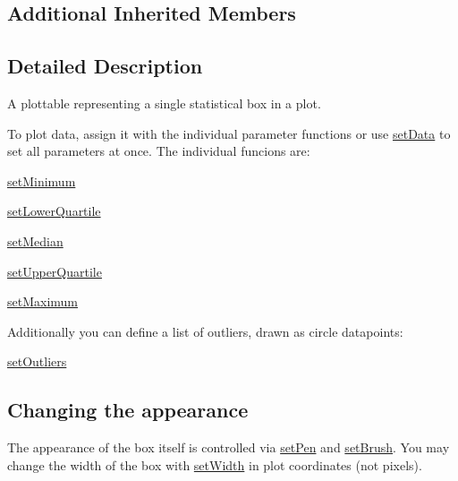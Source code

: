 \subsection*{Additional Inherited Members}


\subsection{Detailed Description}
A plottable representing a single statistical box in a plot. 



To plot data, assign it with the individual parameter functions or use \hyperlink{class_q_c_p_statistical_box_adf50c57b635edb12470c0e4a986aff37}{set\-Data} to set all parameters at once. The individual funcions are\-: \begin{DoxyItemize}
\item \hyperlink{class_q_c_p_statistical_box_a84ff7cc61ba44890f0c3e0c99c19941e}{set\-Minimum} \item \hyperlink{class_q_c_p_statistical_box_a680941af5e23d902013962fa67223f9e}{set\-Lower\-Quartile} \item \hyperlink{class_q_c_p_statistical_box_a65970e77a897da4ecb4b15300868aad3}{set\-Median} \item \hyperlink{class_q_c_p_statistical_box_a65a1375f941c5a2077b5201229e89346}{set\-Upper\-Quartile} \item \hyperlink{class_q_c_p_statistical_box_acec5ad1901f00f2c5387cfb4d9787eb3}{set\-Maximum}\end{DoxyItemize}
Additionally you can define a list of outliers, drawn as circle datapoints\-: \begin{DoxyItemize}
\item \hyperlink{class_q_c_p_statistical_box_af9bc09620e0bf93bf444ee35e5800d1d}{set\-Outliers}\end{DoxyItemize}
\hypertarget{class_q_c_p_statistical_box_appearance}{}\subsection{Changing the appearance}\label{class_q_c_p_statistical_box_appearance}
The appearance of the box itself is controlled via \hyperlink{class_q_c_p_abstract_plottable_ab74b09ae4c0e7e13142fe4b5bf46cac7}{set\-Pen} and \hyperlink{class_q_c_p_abstract_plottable_a7a4b92144dca6453a1f0f210e27edc74}{set\-Brush}. You may change the width of the box with \hyperlink{class_q_c_p_statistical_box_a0b62775bd67301b1eba5c785f2b26f14}{set\-Width} in plot coordinates (not pixels).

